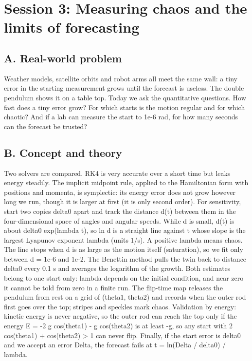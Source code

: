 \documentclass[11pt,a4paper]{article}
\begin{document}
\section{Session 3: Measuring chaos and the limits of forecasting}

\subsection*{A. Real-world problem}
Weather models, satellite orbits and robot arms all meet the same wall: a tiny error in the starting measurement grows until the forecast is useless. The double pendulum shows it on a table top. Today we ask the quantitative questions. How fast does a tiny error grow? For which starts is the motion regular and for which chaotic? And if a lab can measure the start to 1e-6 rad, for how many seconds can the forecast be trusted?

\subsection*{B. Concept and theory}
Two solvers are compared. RK4 is very accurate over a short time but leaks energy steadily. The implicit midpoint rule, applied to the Hamiltonian form with positions and momenta, is symplectic: its energy error does not grow however long we run, though it is larger at first (it is only second order). For sensitivity, start two copies delta0 apart and track the distance d(t) between them in the four-dimensional space of angles and angular speeds. While d is small, d(t) is about delta0 exp(lambda t), so ln d is a straight line against t whose slope is the largest Lyapunov exponent lambda (units 1/s). A positive lambda means chaos. The line stops when d is as large as the motion itself (saturation), so we fit only between d = 1e-6 and 1e-2. The Benettin method pulls the twin back to distance delta0 every 0.1 s and averages the logarithm of the growth. Both estimates belong to one start only: lambda depends on the initial condition, and near zero it cannot be told from zero in a finite run. The flip-time map releases the pendulum from rest on a grid of (theta1, theta2) and records when the outer rod first goes over the top; stripes and speckles mark chaos. Validation by energy: kinetic energy is never negative, so the outer rod can reach the top only if the energy E = -2 g cos(theta1) - g cos(theta2) is at least -g, so any start with 2 cos(theta1) + cos(theta2) \textgreater{} 1 can never flip. Finally, if the start error is delta0 and we accept an error Delta, the forecast fails at t = ln(Delta / delta0) / lambda.
\end{document}
